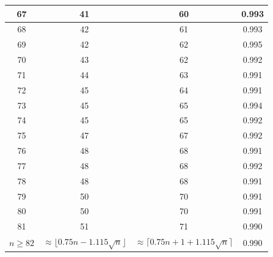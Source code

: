 \begin{table}
\begin{tabular}{|c|c|c|c|}
 67  & 41  & 60 & 0.993  \\ \hline
 68  & 42  & 61 & 0.993  \\ \hline
 69  & 42  & 62 & 0.995  \\ \hline
 70  & 43  & 62 & 0.992  \\ \hline
 71  & 44  & 63 & 0.991  \\ \hline
 72  & 45  & 64 & 0.991  \\ \hline
 73  & 45  & 65 & 0.994  \\ \hline
 74  & 45  & 65 & 0.992  \\ \hline
 75  & 47  & 67 & 0.992  \\ \hline
 76  & 48  & 68 & 0.991  \\ \hline
 77  & 48  & 68 & 0.992  \\ \hline
 78  & 48  & 68 & 0.991  \\ \hline
 79  & 50  & 70 & 0.991  \\ \hline
 80  & 50  & 70 & 0.991  \\ \hline
 81  & 51  & 71 & 0.990  \\ \hline
\hline $n \geq 82$ &
\multicolumn{1}{p{20mm}|}{$\approx \lfloor 0.75 n - 1.115 \sqrt{n}\rfloor$} &
\multicolumn{1}{p{20mm}|}{$\approx \lceil 0.75 n + 1 + 1.115 \sqrt{n}\rceil$} &
0.990 \\ \hline
\end{tabular}
 \hspace{2mm}
\end{table}


